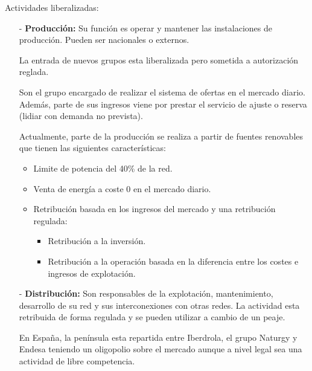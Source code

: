 Actividades liberalizadas:
\begin{itemize}
	\item [-] \textbf{Producción:} Su función es operar y mantener las instalaciones de producción. Pueden ser nacionales o externos.
	
	
	La entrada de nuevos grupos esta liberalizada pero sometida a autorización reglada.
	
	
	Son el grupo encargado de realizar el sistema de ofertas en el mercado diario. Además, parte de sus ingresos viene por prestar el servicio de ajuste o reserva (lidiar con demanda no prevista).
	
	
	Actualmente, parte de la producción se realiza a partir de fuentes renovables que tienen las siguientes características:
	\begin{itemize}
		\item Limite de potencia del 40\% de la red.
		\item Venta de energía a coste 0 en el mercado diario.
		\item Retribución basada en los ingresos del mercado y una retribución regulada:
		\begin{itemize}
			\item Retribución a la inversión.
			\item Retribución a la operación basada en la diferencia entre los costes e ingresos de explotación.
		\end{itemize}
	\end{itemize}
	\item [-] \textbf{Distribución:} Son responsables de la explotación, mantenimiento, desarrollo de su red y sus interconexiones con
	otras redes. La actividad esta retribuida de forma regulada y se pueden utilizar a cambio de un peaje. 
	
	
	En España, la península esta repartida entre Iberdrola, el grupo Naturgy y Endesa teniendo un oligopolio sobre el mercado aunque a nivel legal sea una actividad de libre competencia.
	

\end{itemize}
